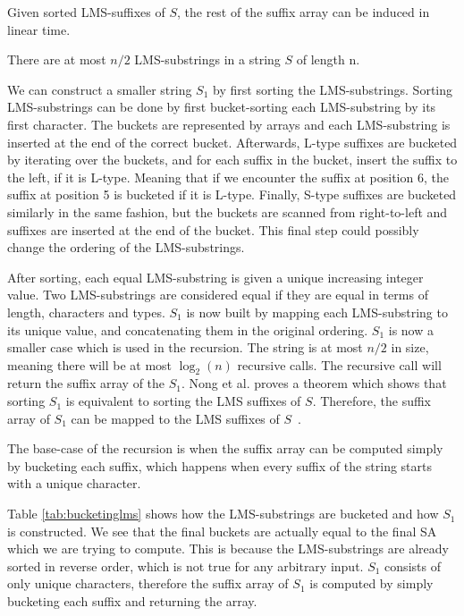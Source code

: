 \begin{theorem}

    Given sorted LMS-suffixes of $S$, the rest of the suffix array can be induced in linear
    time. 

\end{theorem}

\begin{theorem}
    There are at most $n / 2$ LMS-substrings in a string $S$ of length n.
\end{theorem}

We can construct a smaller string $S_1$ by first sorting the LMS-substrings. Sorting
LMS-substrings can be done by first bucket-sorting each LMS-substring by its first
character. The buckets are represented by arrays and each LMS-substring is inserted at the
end of the correct bucket. Afterwards, L-type suffixes are bucketed by iterating over the
buckets, and for each suffix in the bucket, insert the suffix to the left, if it is
L-type. Meaning that if we encounter the suffix at position 6, the suffix at position 5 is
bucketed if it is L-type. Finally, S-type suffixes are bucketed similarly in the same
fashion, but the buckets are scanned from right-to-left and suffixes are inserted at the
end of the bucket. This final step could possibly change the ordering of the
LMS-substrings.

After sorting, each equal LMS-substring is given a unique increasing integer value. Two
LMS-substrings are considered equal if they are equal in terms of length, characters and
types. $S_1$ is now built by mapping each LMS-substring to its unique value, and
concatenating them in the original ordering. $S_1$ is now a smaller case which is used in
the recursion. The string is at most $n / 2$ in size, meaning there will be at most
$\log_2(n)$ recursive calls. The recursive call will return the suffix array of the $S_1$.
Nong et al. proves a theorem which shows that sorting $S_1$ is
equivalent to sorting the LMS suffixes of $S$. Therefore, the suffix array of $S_1$ can be
mapped to the LMS suffixes of $S$~\cite{LinearTimeSuffixArraySAIS}.

The base-case of the recursion is when the suffix array can be computed simply by
bucketing each suffix, which happens when every suffix of the string starts with a unique
character. 

Table \ref{tab:bucketinglms} shows how the LMS-substrings are bucketed and how $S_1$ is
constructed. We see that the final buckets are actually equal to the final SA which we are
trying to compute. This is because the LMS-substrings are already sorted in reverse order,
which is not true for any arbitrary input. $S_1$ consists of only unique characters,
therefore the suffix array of $S_1$ is computed by simply bucketing each suffix and
returning the array.

